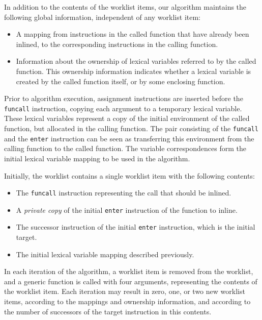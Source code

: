 In addition to the contents of the worklist items, our algorithm
maintains the following global information, independent of any
worklist item:

\begin{itemize}
\item A mapping from instructions in the called function that have
  already been inlined, to the corresponding instructions in the
  calling function.
\item Information about the ownership of lexical variables referred to
  by the called function.  This ownership information indicates
  whether a lexical variable is created by the called function itself,
  or by some enclosing function.
\end{itemize}

Prior to algorithm execution, assignment instructions are inserted
before the \texttt{funcall} instruction, copying each argument to a
temporary lexical variable.  These lexical variables represent a copy
of the initial environment of the called function, but allocated in
the calling function.  The pair consisting of the \texttt{funcall} and
the \texttt{enter} instruction can be seen as transferring this
environment from the calling function to the called function.  The
variable correspondences form the initial lexical variable mapping to
be used in the algorithm.

Initially, the worklist contains a single worklist item with the
following contents:

\begin{itemize}
\item The \texttt{funcall} instruction representing the call that
  should be inlined.
\item A \emph{private copy} of the initial \texttt{enter} instruction
  of the function to inline.
\item The successor instruction of the initial \texttt{enter}
  instruction, which is the initial target.
\item The initial lexical variable mapping described previously.
\end{itemize}

In each iteration of the algorithm, a worklist item is removed from
the worklist, and a generic function is called with four arguments,
representing the contents of the worklist item.  Each iteration may
result in zero, one, or two new worklist items, according to the
mappings and ownership information, and according to the number of
successors of the target instruction in this contents.

